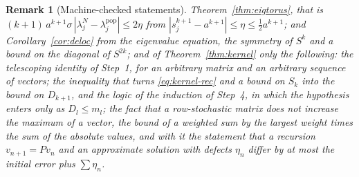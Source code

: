 \documentclass[11pt,a4paper]{article}
\theoremstyle{stmt}
\theoremstyle{defn}
\theoremstyle{rmk}
\newtheorem{remark}[theorem]{Remark}
\numberwithin{equation}{section}
\begin{document}
{\begin{remark}[Machine-checked statements]
Theorem~\ref{thm:eigtorus}, that is $(k+1)\,a^{k+1}\sigma\,|\lambda^N_j-\lambda^{\mathrm{pop}}_j|\le2\eta$ from $|s_j^{k+1}-a^{k+1}|\le\eta\le\frac12a^{k+1}$; and Corollary~\ref{cor:deloc} from the eigenvalue equation, the symmetry of $S^k$ and a bound on the diagonal of $S^{2k}$; and of Theorem~\ref{thm:kernel} only the following: the telescoping identity of Step~1, for an arbitrary matrix and an arbitrary sequence of vectors; the inequality that turns \eqref{eq:kernel-rec} and a bound on $S_k$ into the bound on $D_{k+1}$, and the logic of the induction of Step~4, in which the hypothesis enters only as $D_l\le m_l$; the fact that a row-stochastic matrix does not increase the maximum of a vector, the bound of a weighted sum by the largest weight times the sum of the absolute values, and with it the statement that a recursion $v_{n+1}=Pv_n$ and an approximate solution with defects $\eta_n$ differ by at most the initial error plus $\sum\eta_n$.


\end{remark}}
\end{document}
